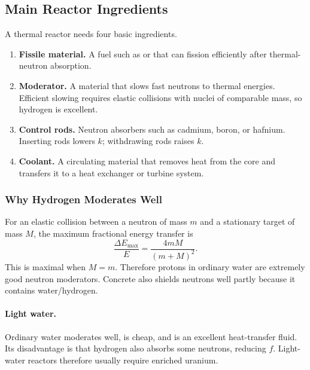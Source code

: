 \subsection{Main Reactor Ingredients}
\label{subsec:lec11:reactor_ingredients}

A thermal reactor needs four basic ingredients.

\begin{enumerate}[label=\textbf{\arabic*.},leftmargin=1.2cm]
  \item \textbf{Fissile material.} A fuel such as  or
         that can fission efficiently after thermal-neutron
        absorption.
  \item \textbf{Moderator.} A material that slows fast neutrons to thermal
        energies. Efficient slowing requires elastic collisions with nuclei of
        comparable mass, so hydrogen is excellent.
  \item \textbf{Control rods.} Neutron absorbers such as cadmium, boron, or
        hafnium. Inserting rods lowers $k$; withdrawing rods raises $k$.
  \item \textbf{Coolant.} A circulating material that removes heat from the
        core and transfers it to a heat exchanger or turbine system.
\end{enumerate}

\subsubsection*{Why Hydrogen Moderates Well}
For an elastic collision between a neutron of mass $m$ and a stationary target
of mass $M$, the maximum fractional energy transfer is
\begin{equation}
  \boxed{\frac{\Delta E_{\max}}{E}
  =\frac{4mM}{(m+M)^2}.}
  \label{eq:lec11:elastic_transfer}
\end{equation}
This is maximal when $M=m$. Therefore protons in ordinary water are extremely
good neutron moderators. Concrete also shields neutrons well partly because it
contains water/hydrogen.

\paragraph{Light water.}
Ordinary water moderates well, is cheap, and is an excellent heat-transfer fluid.
Its disadvantage is that hydrogen also absorbs some neutrons, reducing $f$.
Light-water reactors therefore usually require enriched uranium.

